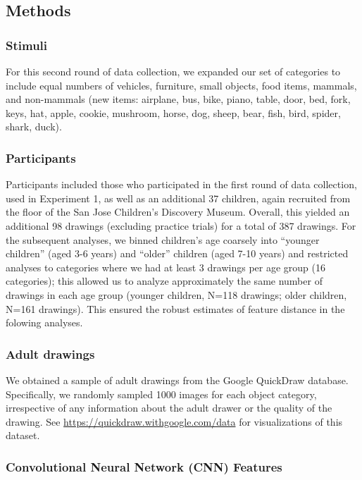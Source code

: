 \documentclass[10pt, letterpaper]{article}
\begin{document}
\subsection{Methods}\label{methods-1}

\subsubsection{Stimuli}\label{stimuli-1}

For this second round of data collection, we expanded our set of
categories to include equal numbers of vehicles, furniture, small
objects, food items, mammals, and non-mammals (new items: airplane, bus,
bike, piano, table, door, bed, fork, keys, hat, apple, cookie, mushroom,
horse, dog, sheep, bear, fish, bird, spider, shark, duck).

\subsubsection{Participants}\label{participants-1}

Participants included those who participated in the first round of data
collection, used in Experiment 1, as well as an additional 37 children,
again recruited from the floor of the San Jose Children's Discovery
Museum. Overall, this yielded an additional 98 drawings (excluding
practice trials) for a total of 387 drawings. For the subsequent
analyses, we binned children's age coarsely into ``younger children''
(aged 3-6 years) and ``older'' children (aged 7-10 years) and restricted
analyses to categories where we had at least 3 drawings per age group
(16 categories); this allowed us to analyze approximately the same
number of drawings in each age group (younger children, N=118 drawings;
older children, N=161 drawings). This ensured the robust estimates of
feature distance in the folowing analyses.

\subsubsection{Adult drawings}\label{adult-drawings}

We obtained a sample of adult drawings from the Google QuickDraw
database. Specifically, we randomly sampled 1000 images for each object
category, irrespective of any information about the adult drawer or the
quality of the drawing. See \url{https://quickdraw.withgoogle.com/data}
for visualizations of this dataset.

\subsubsection{Convolutional Neural Network (CNN)
Features}\label{convolutional-neural-network-cnn-features}
\end{document}
